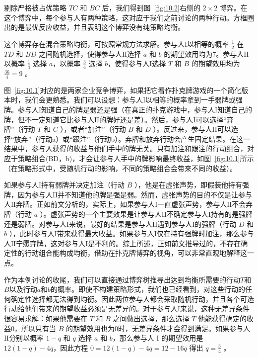 剔除严格被占优策略 \({TC}\) 和 \({BC}\) 后，我们得到图~\ref{fig:10.2}右侧的 \(2 \times  2\) 博弈。在这个博弈中，每个参与人有两种策略，这对应于我们之前讨论的两种行动。方框圈出的是最优反应收益，并且表明这个博弈没有纯策略均衡。

这个博弈存在混合策略均衡，可按照常规方法求解。参与人$\mathrm{I}$以相等的概率 \(\frac{1}{2}\) 在 \({TD}\) 和 \({BD}\) 之间随机选择，使得参与人$\mathrm{II}$选择 \(a\) 和 \(b\) 的期望效用均为7。参与人$\mathrm{II}$以概率 \(\frac{1}{4}\) 选择 \(a\)，以概率 \(\frac{3}{4}\) 选择 \(b\)，使得参与人$\mathrm{I}$选择 \(T\) 和 \(B\) 的期望效用均为 \(\frac{36}{4} = 9\) 。

图~\ref{fig:10.1}对应的是两家企业竞争博弈，如果把它看作扑克牌游戏的一个简化版本时，我们会更熟悉。我们可以设想：参与人$\mathrm{I}$以相等的概率拿到一手弱牌或强牌。参与人$\mathrm{I}$知道自己的牌是弱还是强（在真正的扑克游戏中，参与人$\mathrm{I}$知道自己的牌，但不一定知道它比参与人$\mathrm{II}$的牌好还是差）。然后，参与人$\mathrm{I}$可以选择“弃牌”（行动 \(T\) 和 \(C\) ），或者“加注”（行动 \(B\) 和 \(D\) ）。反过来，参与人$\mathrm{II}$可以选择“放弃”（行动a）或“跟注”（行动b）。弃牌和放弃行动会产生固定结果。在这一结果中，参与人获得的收益与他们手中的牌无关。只有加注和跟注的行动组合，对应于策略组合(BD，b)，才会让参与人手中的牌影响最终收益，如图~\ref{fig:10.1}所示（在策略形式中，受随机行动的影响，不同的策略组合会带来不同的收益）。

如果参与人$\mathrm{I}$持有弱牌并决定加注（行动 \(B\) ），他是在虚张声势，即假装他持有强牌，因为参与人$\mathrm{II}$并不知道他的牌是强是弱。然而，虚张声势的目的不仅是让参与人$\mathrm{II}$弃牌。正如前文分析的，实际上，如果参与人$\mathrm{I}$一直虚张声势，参与人$\mathrm{II}$不会弃牌（行动 \(a\) ）。虚张声势的一个主要效果是让参与人$\mathrm{II}$不确定参与人$\mathrm{I}$持有的是强牌还是弱牌。对参与人$\mathrm{I}$来说，最好的结果是参与人$\mathrm{II}$遇到参与人$\mathrm{I}$的强牌（行动 \(D\) 和 \(b\) ），此时参与人$\mathrm{I}$带来获得最大收益。如果参与人$\mathrm{I}$仅在持有强牌时加注，那么参与人$\mathrm{II}$宁愿弃牌，这对参与人$\mathrm{I}$是不利的。综上所述，正如前文推导过的，不存在确定性的行动组合能构成均衡，借助在扑克牌博弈的视角，可以非常直观地解释这一点。

作为本例讨论的收尾，我们可以直接通过博弈树推导出达到均衡所需要的行动$T$和$B$以及行动$a$和$b$的概率。即使不构建策略形式，我们也已经看到，对这些行动的任何确定性选择都无法得到均衡。因此两位参与人都会采取随机行动，并且各个可选行动给他们带来的期望收益必须是无差异的。对于参与人$\mathrm{I}$来说，这种无差异条件很容易求解：如果他需要在 \(T\) 和 \(B\) 之间做出选择，那么选择 \(T\) 他能获得确定的收益0，所以只有当 \(B\) 的期望效用也为0时，无差异条件才会得到满足。如果参与人$\mathrm{II}$分别以概率 \(1 - q\) 和 \(q\) 选择 \(a\) 和 \(b\)，那么参与人 \(\mathrm{I}\) 的期望效用是 \({12}\left( {1 - q}\right)  - {4q}\)，因此方程 \(0 = {12}\left( {1 - q}\right)  - {4q} = {12} - {16q}\) 得出 \(q = \frac{3}{4}\) 。

